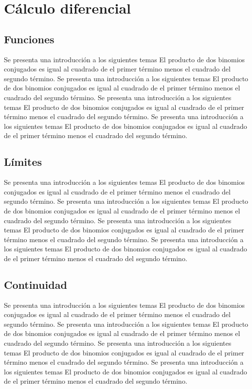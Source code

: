 \chapter{Cálculo diferencial}
\section{Funciones}
Se presenta una introducción a los siguientes temas El producto de dos binomios conjugados es igual al cuadrado de el primer término menos el cuadrado del segundo término.
Se presenta una introducción a los siguientes temas El producto de dos binomios conjugados es igual al cuadrado de el primer término menos el cuadrado del segundo término.
Se presenta una introducción a los siguientes temas El producto de dos binomios conjugados es igual al cuadrado de el primer término menos el cuadrado del segundo término.
Se presenta una introducción a los siguientes temas El producto de dos binomios conjugados es igual al cuadrado de el primer término menos el cuadrado del segundo término. 

\section{Límites}
Se presenta una introducción a los siguientes temas El producto de dos binomios conjugados es igual al cuadrado de el primer término menos el cuadrado del segundo término.
Se presenta una introducción a los siguientes temas El producto de dos binomios conjugados es igual al cuadrado de el primer término menos el cuadrado del segundo término.
Se presenta una introducción a los siguientes temas El producto de dos binomios conjugados es igual al cuadrado de el primer término menos el cuadrado del segundo término.
Se presenta una introducción a los siguientes temas El producto de dos binomios conjugados es igual al cuadrado de el primer término menos el cuadrado del segundo término.

\section{Continuidad}
Se presenta una introducción a los siguientes temas El producto de dos binomios conjugados es igual al cuadrado de el primer término menos el cuadrado del segundo término.
Se presenta una introducción a los siguientes temas El producto de dos binomios conjugados es igual al cuadrado de el primer término menos el cuadrado del segundo término.
Se presenta una introducción a los siguientes temas El producto de dos binomios conjugados es igual al cuadrado de el primer término menos el cuadrado del segundo término.
Se presenta una introducción a los siguientes temas El producto de dos binomios conjugados es igual al cuadrado de el primer término menos el cuadrado del segundo término.

